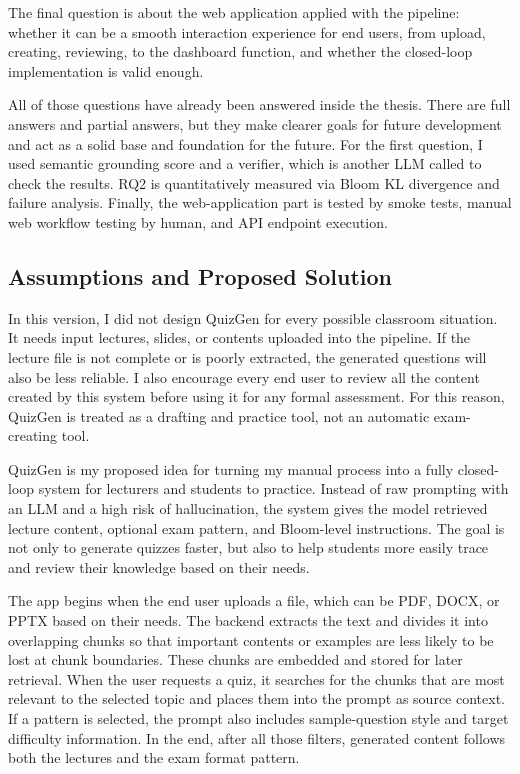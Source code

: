 \documentclass[12pt,a4paper]{article}
\begin{document}
The final question is about the web application applied with the pipeline:
whether it can be a smooth interaction experience for end users, from upload,
creating, reviewing, to the dashboard function, and whether the closed-loop
implementation is valid enough.

All of those questions have already been answered inside the thesis. There
are full answers and partial answers, but they make clearer goals for future
development and act as a solid base and foundation for the future. For the
first question, I used semantic grounding score and a verifier, which is
another LLM called to check the results. RQ2 is quantitatively measured via
Bloom KL divergence and failure analysis. Finally, the web-application part
is tested by smoke tests, manual web workflow testing by human, and API
endpoint execution.

\subsection{Assumptions and Proposed Solution}

In this version, I did not design QuizGen for every possible classroom
situation. It needs input lectures, slides, or contents uploaded into the
pipeline. If the lecture file is not complete or is poorly extracted, the
generated questions will also be less reliable. I also encourage every end
user to review all the content created by this system before using it for
any formal assessment. For this reason, QuizGen is treated as a drafting and
practice tool, not an automatic exam-creating tool.

QuizGen is my proposed idea for turning my manual process into a fully
closed-loop system for lecturers and students to practice. Instead of raw
prompting with an LLM and a high risk of hallucination, the system gives the
model retrieved lecture content, optional exam pattern, and Bloom-level
instructions. The goal is not only to generate quizzes faster, but also to
help students more easily trace and review their knowledge based on their
needs.

The app begins when the end user uploads a file, which can be PDF, DOCX, or
PPTX based on their needs. The backend extracts the text and divides it into
overlapping chunks so that important contents or examples are less likely to
be lost at chunk boundaries. These chunks are embedded and stored for later
retrieval. When the user requests a quiz, it searches for the chunks that
are most relevant to the selected topic and places them into the prompt as
source context. If a pattern is selected, the prompt also includes
sample-question style and target difficulty information. In the end, after
all those filters, generated content follows both the lectures and the exam
format pattern.
\end{document}
